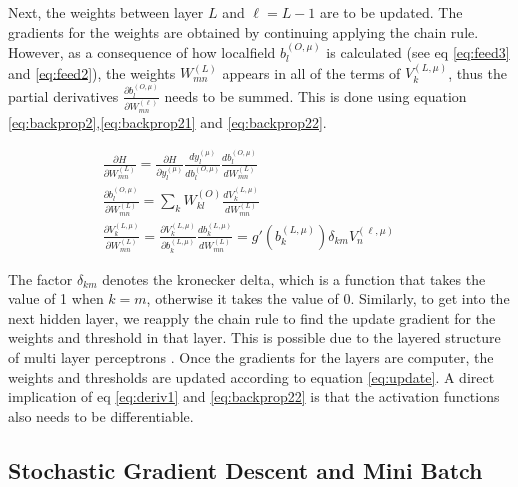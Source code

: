 Next, the weights between layer $L$ and $\ell = L-1$ are to be updated. The gradients for the weights are obtained by continuing applying the chain rule\cite{mehligcourseslides}. However, as a consequence of how localfield $b^{(O,\mu)}_l$ is calculated (see eq \eqref{eq:feed3} and \eqref{eq:feed2}), the weights $W^{(L)}_{mn}$ appears in all of the terms of $V_k^{(L,\mu)}$, thus the partial derivatives $\frac{\partial b_l^{(O,\mu)}}{\partial W^{(\ell)}_{mn}}$ needs to be summed. This is done using equation \eqref{eq:backprop2},\eqref{eq:backprop21} and \eqref{eq:backprop22}.

\begin{align}
    \frac{\partial H}{\partial W^{(L)}_{mn}}=\frac{\partial H}{\partial y^{(\mu)}_l}\frac{dy_l^{(\mu)}}{db^{(O,\mu)}_l}\frac{db_l^{(O,\mu)}}{dW^{(L)}_{mn}} && \label{eq:backprop2}\\
    \frac{\partial b^{(O,\mu)}_l}{\partial W^{(L)}_{mn}} = \sum_k W^{(O)}_{kl} \frac{dV_k^{(L,\mu)}}{dW^{(L)}_{mn}}  &&\label{eq:backprop21}\\
    \frac{\partial V_k^{(L,\mu)}}{\partial W^{(L)}_{mn}} = \frac{\partial V_k^{(L,\mu)}}{\partial b_k^{(L,\mu)}}\frac{db_k^{(L,\mu)}}{dW^{(L)}_{mn}} = g'(b_k^{(L,\mu)})\delta_{km}V^{(\ell,\mu)}_n  &&\label{eq:backprop22}
\end{align}

The factor $\delta_{km}$ denotes the kronecker delta, which is a function that takes the value of 1 when $k=m$, otherwise it takes the value of 0. Similarly, to get into the next hidden layer, we reapply the chain rule to find the update gradient for the weights and threshold in that layer. This is possible due to the layered structure of multi layer perceptrons \cite{mehligcourseslides}. Once the gradients for the layers are computer, the weights and thresholds are updated according to equation \eqref{eq:update}. A direct implication of eq \eqref{eq:deriv1} and \eqref{eq:backprop22} is that the activation functions also needs to be differentiable.

\subsection{Stochastic Gradient Descent and Mini Batch}

